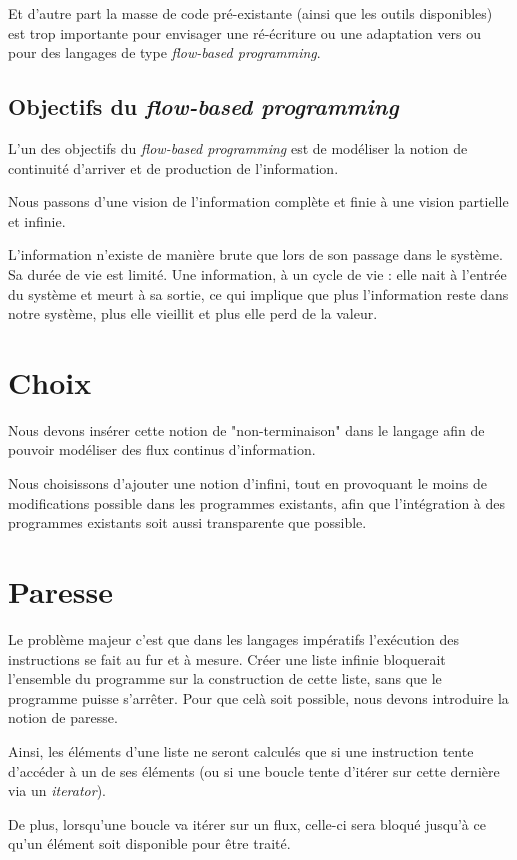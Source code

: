 \documentclass{article}
\begin{document}
Et d'autre part la masse de code pré-existante (ainsi que les outils disponibles)
est trop importante pour envisager une ré-écriture ou une adaptation
vers ou pour des langages de type \emph{flow-based programming}.

\subsection{Objectifs du \emph{flow-based programming}}
L'un des objectifs du \emph{flow-based programming} est de modéliser la notion de
continuité d'arriver et de production de l'information.

Nous passons d'une vision de l'information complète et finie à une vision partielle
et infinie.

L'information n'existe de manière brute que lors de son passage dans le système.
Sa durée de vie est limité.
Une information, à un cycle de vie : elle nait à l'entrée du système et meurt à sa
sortie, ce qui implique que plus l'information reste dans notre système, plus elle
vieillit et plus elle perd de la valeur.

\section{Choix}
Nous devons insérer cette notion de "non-terminaison" dans le langage afin de
pouvoir modéliser des flux continus d'information.

Nous choisissons d'ajouter une notion d'infini, tout en provoquant le moins de
modifications possible dans les programmes existants, afin que l'intégration à
des programmes existants soit aussi transparente que possible.

\section{Paresse}
Le problème majeur c'est que dans les langages impératifs l'exécution des instructions
se fait au fur et à mesure.
Créer une liste infinie bloquerait l'ensemble du programme sur la construction de
cette liste, sans que le programme puisse s'arrêter.
Pour que celà soit possible, nous devons introduire la notion de paresse.

Ainsi, les éléments d'une liste ne seront calculés que si une instruction tente
d'accéder à un de ses éléments (ou si une boucle tente d'itérer sur cette dernière
via un \emph{iterator}).

De plus, lorsqu'une boucle va itérer sur un flux, celle-ci sera bloqué jusqu'à ce
qu'un élément soit disponible pour être traité.
\end{document}
